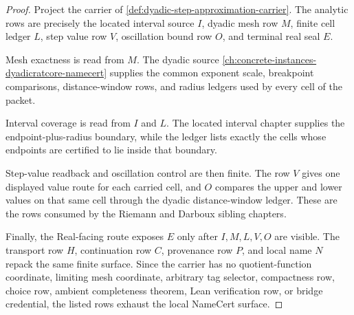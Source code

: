 \begin{proof}
Project the carrier of \autoref{def:dyadic-step-approximation-carrier}. The analytic rows are precisely the located interval source $I$, dyadic mesh row $M$, finite cell ledger $L$, step value row $V$, oscillation bound row $O$, and terminal real seal $E$.

Mesh exactness is read from $M$. The dyadic source \autoref{ch:concrete-instances-dyadicratcore-namecert} supplies the common exponent scale, breakpoint comparisons, distance-window rows, and radius ledgers used by every cell of the packet.

Interval coverage is read from $I$ and $L$. The located interval chapter supplies the endpoint-plus-radius boundary, while the ledger lists exactly the cells whose endpoints are certified to lie inside that boundary.

Step-value readback and oscillation control are then finite. The row $V$ gives one displayed value route for each carried cell, and $O$ compares the upper and lower values on that same cell through the dyadic distance-window ledger. These are the rows consumed by the Riemann and Darboux sibling chapters.

Finally, the Real-facing route exposes $E$ only after $I,M,L,V,O$ are visible. The transport row $H$, continuation row $C$, provenance row $P$, and local name $N$ repack the same finite surface. Since the carrier has no quotient-function coordinate, limiting mesh coordinate, arbitrary tag selector, compactness row, choice row, ambient completeness theorem, Lean verification row, or bridge credential, the listed rows exhaust the local NameCert surface.
\end{proof}

